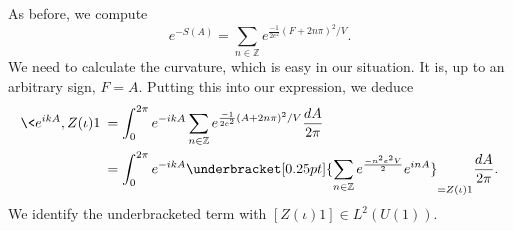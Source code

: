 As before, we compute
\begin{equation}%
e^{-S(A)} = \sum_{n\in\mathbb{Z}} e^{\frac{-1}{2e^{2}}(F+2n\pi)^{2}/V}.
\end{equation}
We need to calculate the curvature, which is easy in our
situation. It is, up to an arbitrary sign, $F=A$. Putting this
into our expression, we deduce
\begin{subequations}
\begin{align}
\<e^{ikA},Z(\iota)1\> &=
\int^{2\pi}_{0}e^{-ikA}\sum_{n\in\mathbb{Z}}e^{\frac{-1}{2e^{2}}(A+2n\pi)^{2}/V}\frac{dA}{2\pi}\\
&= \int^{2\pi}_{0}e^{-ikA}\underbracket[0.25pt]{\sum_{n\in\mathbb{Z}}e^{\frac{-n^{2}e^{2}V}{2}}e^{inA}}_{=Z(\iota)1}\frac{dA}{2\pi}.
\end{align}
\end{subequations}
We identify the underbracketed term with $[Z(\iota)1]\in L^{2}(U(1))$.
